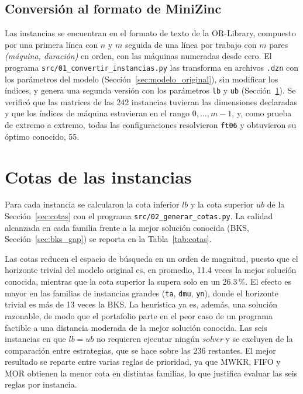 \subsection{Conversión al formato de MiniZinc}

Las instancias se encuentran en el formato de texto de la OR-Library, compuesto
por una primera línea con $n$ y $m$ seguida de una línea por trabajo con $m$
pares \textit{(máquina, duración)} en orden, con las máquinas numeradas desde
cero. El programa \texttt{src/01\_convertir\_instancias.py} las transforma en
archivos \texttt{.dzn} con los parámetros del modelo
(Sección~\ref{sec:modelo_original}), sin modificar los índices, y genera una
segunda versión con los parámetros \texttt{lb} y \texttt{ub}
(Sección~\ref{sec:cotas_instancias}). Se verificó que las matrices de las 242
instancias tuvieran las dimensiones declaradas y que los índices de máquina
estuvieran en el rango $0,\dots,m-1$, y, como prueba de extremo a extremo,
todas las configuraciones resolvieron \texttt{ft06} y obtuvieron su óptimo
conocido, 55.

\section{Cotas de las instancias}
\label{sec:cotas_instancias}

Para cada instancia se calcularon la cota inferior $lb$ y la cota superior
$ub$ de la Sección~\ref{sec:cotas} con el programa
\texttt{src/02\_generar\_cotas.py}. La calidad alcanzada en cada familia frente
a la mejor solución conocida (BKS, Sección~\ref{sec:bks_gap}) se reporta en la
Tabla~\ref{tab:cotas}.



Las cotas reducen el espacio de búsqueda en un orden de magnitud, puesto que el
horizonte trivial del modelo original es, en promedio, 11.4 veces la mejor
solución conocida, mientras que la cota superior la supera solo en un
26.3\,\%. El efecto es mayor en las familias de instancias grandes
(\texttt{ta}, \texttt{dmu}, \texttt{yn}), donde el horizonte trivial es más de
13 veces la BKS. La heurística ya es, además, una solución razonable, de modo
que el portafolio parte en el peor caso de un programa factible a una
distancia moderada de la mejor solución conocida. Las seis instancias en que
$lb = ub$ no requieren ejecutar ningún \textit{solver} y se excluyen de la
comparación entre estrategias, que se hace sobre las 236 restantes. El mejor
resultado se reparte entre varias reglas de prioridad, ya que MWKR, FIFO y MOR
obtienen la menor cota en distintas familias, lo que justifica evaluar las seis
reglas por instancia.

